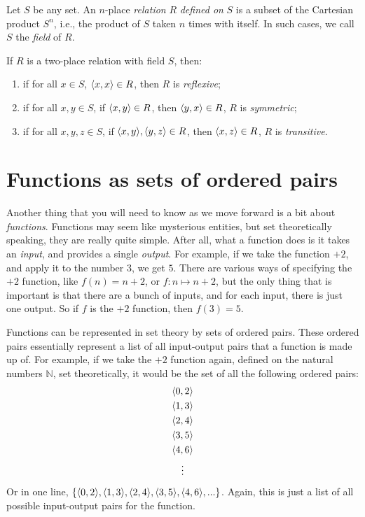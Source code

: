 \begin{defn}
Let $S$ be any set. An $n$-place \textit{relation} $R$ \textit{defined on} $S$ is a subset of the Cartesian product $S^n$, i.e., the product of $S$ taken $n$ times with itself. In such cases, we call $S$ the \textit{field} of $R$. 

If $R$ is a two-place relation with field $S$, then: 
\begin{enumerate}
	\item if for all $x \in S$, $\langle x, x\rangle \in R$, then $R$ is \textit{reflexive};
	\item if for all $x, y \in S$, if $\langle x, y\rangle \in R$, then $\langle y, x\rangle \in R$, $R$ is \textit{symmetric};
	\item if for all $x, y, z \in S$, if $\langle x, y\rangle, \langle y, z\rangle \in R$, then $\langle x, z\rangle \in R$, $R$ is \textit{transitive}. 
\end{enumerate}
\end{defn}

\section{Functions as sets of ordered pairs}

Another thing that you will need to know as we move forward is a bit about \textit{functions}. Functions may seem like mysterious entities, but set theoretically speaking, they are really quite simple. After all, what a function does is it takes an \textit{input}, and provides a single \textit{output}. For example, if we take the function $+2$, and apply it to the number $3$, we get $5$. There are various ways of specifying the $+2$ function, like $f(n)=n+2$, or $f: n \mapsto n+2$, but the only thing that is important is that there are a bunch of inputs, and for each input, there is just one output. So if $f$ is the $+2$ function, then $f(3)=5$.
 

Functions can be represented in set theory by sets of ordered pairs. These ordered pairs essentially represent a list of all input-output pairs that a function is made up of. For example, if we take the $+2$ function again, defined on the natural numbers $\mathbb{N}$, set theoretically, it would be the set of all the following ordered pairs:
\begin{gather*}
	\langle0, 2\rangle\\
	\langle1, 3\rangle\\
	\langle2, 4\rangle\\
	\langle3, 5\rangle\\
	\langle4, 6\rangle\\
	\vdots
\end{gather*}
%
Or in one line, $\{\langle0, 2\rangle, \langle1, 3\rangle, \langle2, 4\rangle,	\langle3, 5\rangle, \langle4, 6\rangle, ...\}$. Again, this is just a list of all possible input-output pairs for the function. 

